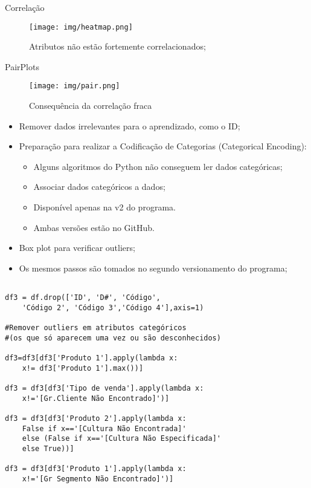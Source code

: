 \documentclass[compress]{beamer}
\begin{document}
\begin{frame}{Correlação}
    \begin{figure}[h!]
        \centering
        \texttt{[image: img/heatmap.png]}
        \caption{Atributos não estão fortemente correlacionados;}
        \label{fig:corr}
    \end{figure}
\end{frame}
\begin{frame}{PairPlots}
    \begin{figure}[h!]
        \centering
        \texttt{[image: img/pair.png]}
        \caption{Consequência da correlação fraca}
        \label{fig:pair1}
    \end{figure}
\end{frame}
\begin{frame}{}
    \begin{itemize}
        \item Remover dados irrelevantes para o aprendizado, como o ID;
        \item Preparação para realizar a Codificação de Categorias (Categorical Encoding):
        \begin{itemize}
            \item Alguns algoritmos do Python não conseguem ler dados categóricas;
            \item Associar dados categóricos a dados;
            \item Disponível apenas na v2 do programa.
            \item Ambas versões estão no GitHub.
        \end{itemize}
        \item Box plot para verificar outliers;
        \item Os mesmos passos são tomados no segundo versionamento do programa;
    \end{itemize}
\end{frame}

\begin{verbatim}

df3 = df.drop(['ID', 'D#', 'Código',
    'Código 2', 'Código 3','Código 4'],axis=1)

#Remover outliers em atributos categóricos
#(os que só aparecem uma vez ou são desconhecidos)

df3=df3[df3['Produto 1'].apply(lambda x:
    x!= df3['Produto 1'].max())]
    
df3 = df3[df3['Tipo de venda'].apply(lambda x:
    x!='[Gr.Cliente Não Encontrado]')]

df3 = df3[df3['Produto 2'].apply(lambda x:
    False if x=='[Cultura Não Encontrada]'
    else (False if x=='[Cultura Não Especificada]'
    else True))]

df3 = df3[df3['Produto 1'].apply(lambda x:
    x!='[Gr Segmento Não Encontrado]')]

\end{verbatim}
\end{document}
